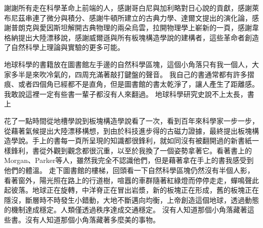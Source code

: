 
\begin{acknowledgement}

謝謝所有走在科學革命上前端的人，感謝哥白尼與加利略對日心說的貢獻，感謝萊布尼茲串連了微分與積分、感謝牛頓所建立的古典力學、達爾文提出的演化論，感謝普朗克與愛因斯坦解開古典物理的兩朵烏雲，拉開物理學上嶄新的一頁，感謝韋格納提出大陸漂移說，感謝威爾遜與所有板塊構造學說的建構者，這些革命者創造了自然科學上理論與實驗的更多可能。
  
地球科學的書籍放在圖書館左手邊的自然科學區塊，這個小角落只有我一個人，大家多半是來吹冷氣的，四周充滿著敲打鍵盤的聲音。  
我自己的書通常都有許多摺痕、或者四個角已經都不是直角，但是圖書館的書太乾淨了，讓人產生了距離感。我敢說這裡一定有些書一輩子都沒有人來翻過。
地球科學研究史說不上太長，書上

花了一點時間從地槽學說到板塊構造學說看了一次，看到百年來科學家一步一步，從藉著氣候提出大陸漂移構想，到由於科技進步得的古磁力證據，最終提出板塊構造學說。手上的書每一頁所呈現的知識都很鋒利，就如同沒有被翻開過的新書紙一樣鋒利，書從外觀到觀念都很沉重，以至於我換了一個姿勢拿著它。看著書上的Morgan、Parker等人，雖然我完全不認識他們，但是藉著拿在手上的書我感受到他們的體溫。  
  走下圖書館的樓梯，回頭看一下自然科學區塊仍然沒有半個人影，看著窗外，陽光照在路上的行道樹，喧囂的車群隨著紅綠燈而停停走走，蟬鳴聲此起彼落。地球正在旋轉，中洋脊正在冒出岩漿，新的板塊正在形成，舊的板塊正在隱沒，斷層時不時發生小錯動，大地不斷邁向均衡，上帝創造這個地球，透過動態的機制達成穩定。人類僅透過秩序達成交通穩定。  
  沒有人知道那個小角落藏著這些書。沒有人知道那個小角落藏著多麼美的事物。

\end{acknowledgement}